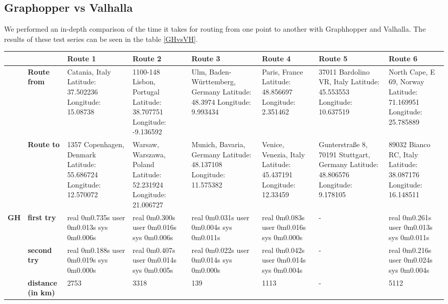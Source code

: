 \subsection{Graphopper vs Valhalla}
We performed an in-depth comparison of the time it takes for routing from one point to another with Graphhopper and Valhalla. The results of these test series can be seen in the table \ref{GHvsVH}.
%
\begin{table}
\centering
\begin{tabular}[H]{@{}p{0.5cm}|p{1.5cm}|p{2.3cm}|p{2.3cm}|p{2.3cm}|p{2.3cm}|p{2.3cm}|p{2.3cm}}
                                       &                           & \textbf{Route 1} & \textbf{Route 2} & \textbf{Route 3} & \textbf{Route 4} & \textbf{Route 5} & \textbf{Route 6}  \\ \hline
                                       & \textbf{Route from}       & Catania, Italy Latitude: 37.502236 Longitude: 15.08738 & 1100-148 Lisbon, Portugal Latitude: 38.707751 Longitude: -9.136592 & Ulm, Baden-Württemberg, Germany Latitude: 48.3974 Longitude: 9.993434 & Paris, France Latitude: 48.856697 Longitude: 2.351462 & 37011 Bardolino VR, Italy Latitude: 45.553553 Longitude: 10.637519 & North Cape, E 69, Norway Latitude: 71.169951 Longitude: 25.785889 \\ \hline
                                       & \textbf{Route to}         &  1357 Copenhagen, Denmark Latitude: 55.686724 Longitude: 12.570072 & Warsaw, Warszawa, Poland Latitude: 52.231924 Longitude: 21.006727 & Munich, Bavaria, Germany Latitude: 48.137108 Longitude: 11.575382 & Venice, Venezia, Italy Latitude: 45.437191 Longitude: 12.33459 & Gunterstraße 8, 70191 Stuttgart, Germany Latitude: 48.806576 Longitude: 9.178105 & 89032 Bianco RC, Italy Latitude: 38.087176 Longitude: 16.148511 \\ \hline
\multirow{3}{*}{\textbf{GH}} & \textbf{first try}        & real 0m0.735s user 0m0.013s sys 0m0.006s & real 0m0.300s user 0m0.016s sys 0m0.006s & real 0m0.031s user 0m0.004s sys 0m0.011s & real 0m0.083s user 0m0.016s sys 0m0.000s & - & real 0m0.261s user 0m0.013s sys 0m0.011s \\ \hline
                                       & \textbf{second try}       & real 0m0.188s user 0m0.019s sys 0m0.000s & real 0m0.407s user 0m0.014s sys 0m0.005s & real 0m0.022s user 0m0.014s sys 0m0.000s & real 0m0.042s user 0m0.014s sys 0m0.004s & - & real 0m0.216s user 0m0.024s sys 0m0.004s \\ \hline
                                       & \textbf{distance (in km)} & 2753 & 3318 & 139 & 1113 & - & 5112 \\ \hline

\end{tabular}
\end{table}
